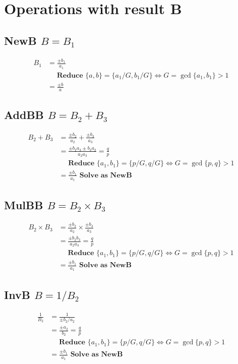 \documentclass{article}
\begin{document}
\section{Operations with result B}

\subsection{NewB $B = B_1$}
\begin{align}
B_1 &= \frac{\pm b_1}{a_1}\\
 &\quad \textbf{ Reduce } \{ a,b \} = \{a_1/G,b_1/G\} \iff G = \gcd \{a_1,b_1\} > 1 \nonumber \\
 &= \frac{\pm b}{a}
\end{align}

\subsection{AddBB $B = B_2 + B_3$}
\begin{align}
B_2 + B_3 &= \frac{\pm b_2}{a_2} + \frac{\pm b_3}{a_3} \\
 &= \frac{\pm b_2a_3 \pm b_3a_2 }{a_2a_3} = \frac{q}{p} \\
 &\quad \textbf{ Reduce } \{ a_1,b_1 \} = \{p/G, q/G\} \iff G = \gcd \{ p,q \} > 1 \nonumber \\
 &= \frac{\pm b_1 }{ a_1 } \textbf{ Solve as NewB }
\end{align}

\subsection{MulBB $B = B_2 \times B_3$}
\begin{align}
B_2 \times B_3 &= \frac{\pm b_2}{a_2} \times \frac{\pm b_3}{a_3} \\
  &= \frac{\pm b_2b_3}{a_2a_3} = \frac{q}{p} \\
 &\quad \textbf{ Reduce } \{ a_1,b_1 \} = \{p/G, q/G\} \iff G = \gcd \{ p,q \} > 1 \nonumber \\
 &= \frac{\pm b_1 }{ a_1 } \textbf{ Solve as NewB }
\end{align}

\subsection{InvB $B = 1 / B_2$}
\begin{align}
\frac{1}{B_2} &= \frac{1}{\pm b_2 / a_2}\\
 &= \frac{\pm a_2}{b_2} = \frac{q}{p} \\
 &\quad \textbf{ Reduce } \{ a_1,b_1 \} = \{p/G, q/G\} \iff G = \gcd \{ p,q \} > 1 \nonumber \\
 &= \frac{\pm b_1 }{ a_1 } \textbf{ Solve as NewB }
\end{align}
\end{document}
